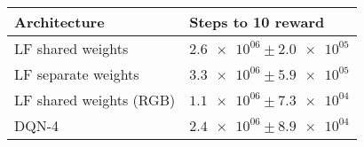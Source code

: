 \begin{tabular}{ll}
\hline
 Architecture            & Steps to 10 reward                \\
\hline
 LF shared weights       & $\num{2.6e+06} \pm \num{2.0e+05}$ \\
 LF separate weights     & $\num{3.3e+06} \pm \num{5.9e+05}$ \\
 LF shared weights (RGB) & $\num{1.1e+06} \pm \num{7.3e+04}$ \\
 DQN-4                   & $\num{2.4e+06} \pm \num{8.9e+04}$ \\
\hline
\end{tabular}